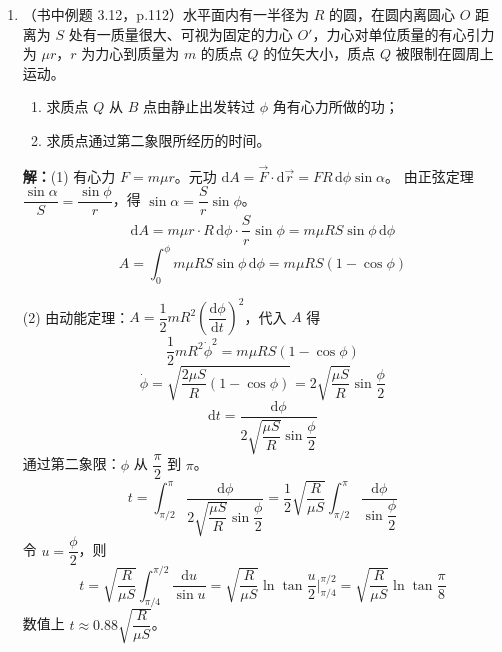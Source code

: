 \documentclass{ctexart}
\begin{document}
\begin{enumerate}
\textbf{解：}设链条线密度为 $\rho$，下垂部分长度 $y$。
(1) 临界条件：下垂部分重力 $=$ 水平部分最大静摩擦力
\[
\rho y g = \mu_0 \rho (l - y)g \;\Longrightarrow\; y = \frac{\mu_0}{1 + \mu_0}l
\]
当 $y > \dfrac{\mu_0}{1 + \mu_0}l$ 时链条开始滑动。

(2) 以整个链条为研究对象，从下垂长度 $b$ 到链条刚滑离桌面（下垂长度 $l$）。
重力做功：
\[
A = \int_{b}^{l} \rho y g\,\mathrm{d}y = \frac12\rho g(l^{2} - b^{2})
\]
摩擦力做功：
\[
A' = -\int_{b}^{l} \mu\rho (l - y)g\,\mathrm{d}y = -\frac12\mu\rho g(l - b)^{2}
\]
由动能定理：
\[
\frac12\rho g(l^{2} - b^{2}) - \frac12\mu\rho g(l - b)^{2} = \frac12\rho l v^{2} - 0
\]
\[
v = \sqrt{\frac{g}{l}(l^{2} - b^{2}) - \frac{\mu g}{l}(l - b)^{2}}
\]

\item（书中例题 3.12，p.112）水平面内有一半径为 $R$ 的圆，在圆内离圆心 $O$ 距离为 $S$ 处有一质量很大、可视为固定的力心 $O'$，力心对单位质量的有心引力为 $\mu r$，$r$ 为力心到质量为 $m$ 的质点 $Q$ 的位矢大小，质点 $Q$ 被限制在圆周上运动。
\begin{enumerate}
  \item 求质点 $Q$ 从 $B$ 点由静止出发转过 $\phi$ 角有心力所做的功；
  \item 求质点通过第二象限所经历的时间。
\end{enumerate}

\textbf{解：}(1) 有心力 $F = m\mu r$。元功 $\mathrm{d}A = \vec{F}\cdot\mathrm{d}\vec{r} = FR\,\mathrm{d}\phi\sin\alpha$。
由正弦定理 $\dfrac{\sin\alpha}{S} = \dfrac{\sin\phi}{r}$，得 $\sin\alpha = \dfrac{S}{r}\sin\phi$。
\[
\mathrm{d}A = m\mu r \cdot R\,\mathrm{d}\phi \cdot \frac{S}{r}\sin\phi = m\mu RS\sin\phi\,\mathrm{d}\phi
\]
\[
A = \int_{0}^{\phi} m\mu RS\sin\phi\,\mathrm{d}\phi = m\mu RS(1 - \cos\phi)
\]

(2) 由动能定理：$A = \dfrac12 mR^{2}\left(\dfrac{\mathrm{d}\phi}{\mathrm{d}t}\right)^{2}$，代入 $A$ 得
\[
\frac12 mR^{2}\dot\phi^{2} = m\mu RS(1 - \cos\phi)
\]
\[
\dot\phi = \sqrt{\frac{2\mu S}{R}(1 - \cos\phi)} = 2\sqrt{\frac{\mu S}{R}}\sin\frac{\phi}{2}
\]
\[
\mathrm{d}t = \frac{\mathrm{d}\phi}{2\sqrt{\dfrac{\mu S}{R}}\sin\dfrac{\phi}{2}}
\]
通过第二象限：$\phi$ 从 $\dfrac{\pi}{2}$ 到 $\pi$。
\[
t = \int_{\pi/2}^{\pi} \frac{\mathrm{d}\phi}{2\sqrt{\dfrac{\mu S}{R}}\sin\dfrac{\phi}{2}}
= \frac{1}{2}\sqrt{\frac{R}{\mu S}}\int_{\pi/2}^{\pi} \frac{\mathrm{d}\phi}{\sin\dfrac{\phi}{2}}
\]
令 $u = \dfrac{\phi}{2}$，则
\[
t = \sqrt{\frac{R}{\mu S}}\int_{\pi/4}^{\pi/2} \frac{\mathrm{d}u}{\sin u}
= \sqrt{\frac{R}{\mu S}}\ln\tan\frac{u}{2}\Big|_{\pi/4}^{\pi/2}
= \sqrt{\frac{R}{\mu S}}\ln\tan\frac{\pi}{8}
\]
数值上 $t \approx 0.88\sqrt{\dfrac{R}{\mu S}}$。


\end{enumerate}
\end{document}
